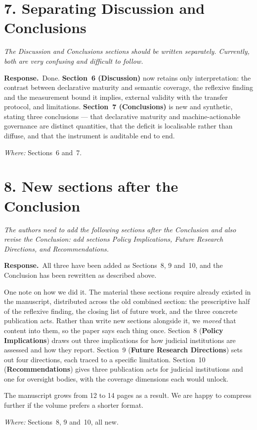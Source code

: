 \documentclass[11pt,a4paper]{article}
\newenvironment{comment}
  {\begin{mdframed}[backgroundcolor=cmtbg, linecolor=cmtrule, linewidth=0.6pt,
     innertopmargin=5pt, innerbottommargin=5pt, innerleftmargin=7pt,
     innerrightmargin=7pt, skipabove=4pt, skipbelow=6pt]\itshape}
  {\end{mdframed}}
\newcommand{\resp}{\par\noindent\textbf{Response.}\ }
\newcommand{\done}[1]{\par\vspace{2pt}\noindent\textit{Where:} #1\par\vspace{4pt}}
\begin{document}
\section*{7. Separating Discussion and Conclusions}
\begin{comment}
The Discussion and Conclusions sections should be written separately. Currently, both are very confusing and difficult to follow.
\end{comment}
\resp Done. \textbf{Section~6 (Discussion)} now retains only interpretation: the contrast between declarative maturity and semantic coverage, the reflexive finding and the measurement bound it implies, external validity with the transfer protocol, and limitations. \textbf{Section~7 (Conclusions)} is new and synthetic, stating three conclusions --- that declarative maturity and machine-actionable governance are distinct quantities, that the deficit is localisable rather than diffuse, and that the instrument is auditable end to end.
\done{Sections~6 and~7.}

\section*{8. New sections after the Conclusion}
\begin{comment}
The authors need to add the following sections after the Conclusion and also revise the Conclusion: add sections Policy Implications, Future Research Directions, and Recommendations.
\end{comment}
\resp All three have been added as Sections~8, 9 and~10, and the Conclusion has been rewritten as described above.

One note on how we did it. The material these sections require already existed in the manuscript, distributed across the old combined section: the prescriptive half of the reflexive finding, the closing list of future work, and the three concrete publication acts. Rather than write new sections alongside it, we \emph{moved} that content into them, so the paper says each thing once. Section~8 (\textbf{Policy Implications}) draws out three implications for how judicial institutions are assessed and how they report. Section~9 (\textbf{Future Research Directions}) sets out four directions, each traced to a specific limitation. Section~10 (\textbf{Recommendations}) gives three publication acts for judicial institutions and one for oversight bodies, with the coverage dimensions each would unlock.

The manuscript grows from 12 to 14 pages as a result. We are happy to compress further if the volume prefers a shorter format.
\done{Sections~8, 9 and~10, all new.}
\end{document}
